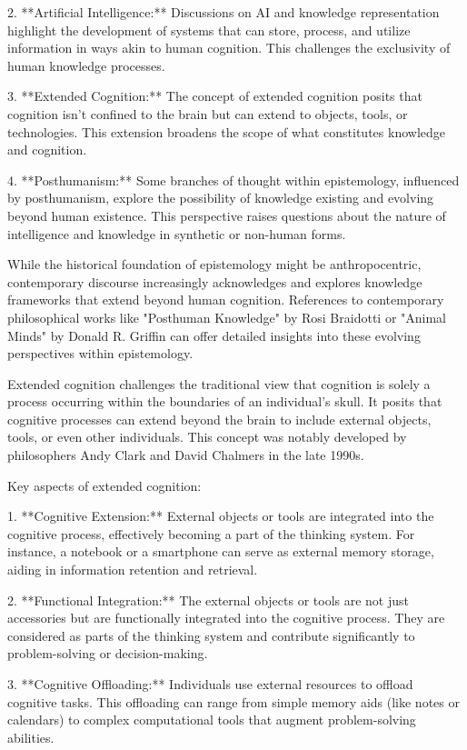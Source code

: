 \documentclass[10pt,titlepage]{book}
\begin{document}
2. **Artificial Intelligence:** Discussions on AI and knowledge representation highlight the development of systems that can store, process, and utilize information in ways akin to human cognition. This challenges the exclusivity of human knowledge processes.

3. **Extended Cognition:** The concept of extended cognition posits that cognition isn't confined to the brain but can extend to objects, tools, or technologies. This extension broadens the scope of what constitutes knowledge and cognition.

4. **Posthumanism:** Some branches of thought within epistemology, influenced by posthumanism, explore the possibility of knowledge existing and evolving beyond human existence. This perspective raises questions about the nature of intelligence and knowledge in synthetic or non-human forms.

While the historical foundation of epistemology might be anthropocentric, contemporary discourse increasingly acknowledges and explores knowledge frameworks that extend beyond human cognition. References to contemporary philosophical works like "Posthuman Knowledge" by Rosi Braidotti or "Animal Minds" by Donald R. Griffin can offer detailed insights into these evolving perspectives within epistemology.

Extended cognition challenges the traditional view that cognition is solely a process occurring within the boundaries of an individual's skull. It posits that cognitive processes can extend beyond the brain to include external objects, tools, or even other individuals. This concept was notably developed by philosophers Andy Clark and David Chalmers in the late 1990s.

Key aspects of extended cognition:

1. **Cognitive Extension:** External objects or tools are integrated into the cognitive process, effectively becoming a part of the thinking system. For instance, a notebook or a smartphone can serve as external memory storage, aiding in information retention and retrieval.

2. **Functional Integration:** The external objects or tools are not just accessories but are functionally integrated into the cognitive process. They are considered as parts of the thinking system and contribute significantly to problem-solving or decision-making.

3. **Cognitive Offloading:** Individuals use external resources to offload cognitive tasks. This offloading can range from simple memory aids (like notes or calendars) to complex computational tools that augment problem-solving abilities.
\end{document}
